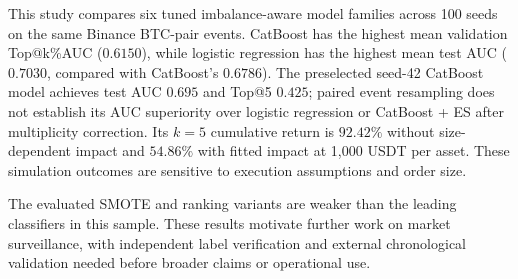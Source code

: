 \documentclass{ieeeaccess}
\begin{document}
\textcolor{revisionblue}{This study compares six tuned imbalance-aware model families across 100 seeds on the same Binance BTC-pair events. CatBoost has the highest mean validation Top@k\%AUC ($0.6150$), while logistic regression has the highest mean test AUC ($0.7030$, compared with CatBoost's $0.6786$). The preselected seed-42 CatBoost model achieves test AUC $0.695$ and Top@5 $0.425$; paired event resampling does not establish its AUC superiority over logistic regression or CatBoost + ES after multiplicity correction. Its $k=5$ cumulative return is $92.42\%$ without size-dependent impact and $54.86\%$ with fitted impact at 1{,}000 USDT per asset. These simulation outcomes are sensitive to execution assumptions and order size.}

\textcolor{revisionblue}{The evaluated SMOTE and ranking variants are weaker than the leading classifiers in this sample. These results motivate further work on market surveillance, with independent label verification and external chronological validation needed before broader claims or operational use.}
\end{document}
